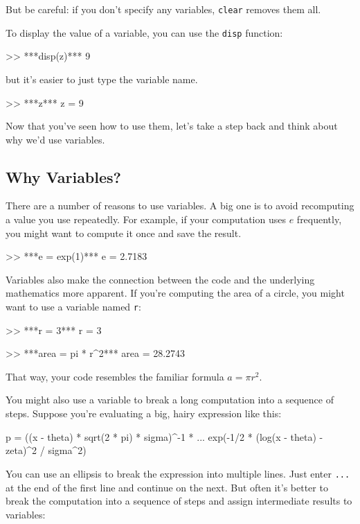 But be careful: if you don't specify any variables, \lstinline{clear} removes them all.


To display the value of a variable, you can use the \lstinline{disp} function:

\begin{code}
>> ***disp(z)***
     9
\end{code}
but it's easier to just type the variable name.

\begin{code}
>> ***z***
z = 9
\end{code}

Now that you've seen how to use them, let's take a step back and think about why we'd use variables.

\subsection{Why Variables?}

There are a number of reasons to use variables.
A big one is to avoid recomputing a value you use repeatedly.  For
example, if your computation uses $e$ frequently, you might
want to compute it once and save the result.

\begin{code}
>> ***e = exp(1)***
e = 2.7183
\end{code}

Variables also make the connection between the code and the underlying
mathematics more apparent.  If you're computing the area of a circle,
you might want to use a variable named \lstinline{r}:

\begin{code}
>> ***r = 3***
r = 3

>> ***area = pi * r^2***
area = 28.2743
\end{code}

That way, your code resembles the familiar formula $a = \pi r^2$.

You might also use a variable to break a long computation into a sequence of steps.
Suppose you're evaluating a big, hairy expression like this:

\begin{code}
p = ((x - theta) * sqrt(2 * pi) * sigma)^-1 * ...
exp(-1/2 * (log(x - theta) - zeta)^2 / sigma^2)
\end{code}
You can use an ellipsis to break the expression into multiple lines.
Just enter \lstinline{...} at the end of the first line and continue on the
next.
But often it's better to break the computation into a sequence of
steps and assign intermediate results to variables:

